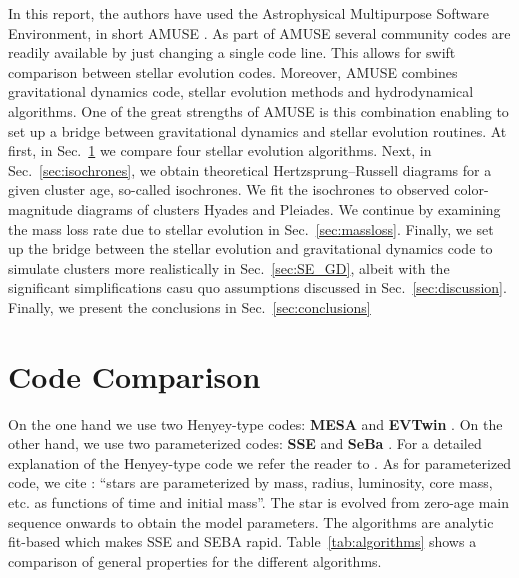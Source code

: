 \documentclass{aa}
\begin{document}
In this report, the authors have used the Astrophysical Multipurpose Software Environment, in short AMUSE \citep{2009NewA...14..369P, 2013CoPhC.183..456P, 2013A&A...557A..84P}. As part of AMUSE several community codes are readily available by just changing a single code line. This allows for swift comparison between stellar evolution codes. Moreover, AMUSE combines gravitational dynamics code, stellar evolution methods and hydrodynamical algorithms. One of the great strengths of AMUSE is this combination enabling to set up a bridge between gravitational dynamics and stellar evolution routines. At first, in Sec.~\ref{sec:algorithms} we compare four stellar evolution algorithms. Next, in Sec.~\ref{sec:isochrones}, we obtain theoretical Hertzsprung–Russell diagrams for a given cluster age, so-called isochrones. We fit the isochrones to observed color-magnitude diagrams of clusters Hyades and Pleiades. We continue by examining the mass loss rate due to stellar evolution in Sec.~\ref{sec:massloss}. Finally, we set up the bridge between the stellar evolution and gravitational dynamics code to simulate clusters more realistically in Sec.~\ref{sec:SE_GD}, albeit with the significant simplifications casu quo assumptions discussed in Sec.~\ref{sec:discussion}. Finally, we present the conclusions in Sec.~\ref{sec:conclusions}

\section{Code Comparison}\label{sec:algorithms}
On the one hand we use two Henyey-type codes: \textbf{MESA} \citep{2011ApJS..192....3P, 2013ApJS..208....4P} and \textbf{EVTwin} \citep{1971MNRAS.151..351E, 1972MNRAS.156..361E, 1973MNRAS.163..279E, 1973A&A....23..325E, 1994MNRAS.270..121H, 1995MNRAS.274..964P, 2001ASPC..229..157E, 2001ApJ...552..664N, 2002ApJ...575..461E, 2007A&A...464L..57S, 2004MNRAS.348..201E, 2008A&A...488.1007G}. On the other hand, we use two parameterized codes:  \textbf{SSE} \citep{2000MNRAS.315..543H} and \textbf{SeBa} \citep{1996A&A...309..179P, 2012A&A...546A..70T}. For a detailed explanation of the Henyey-type code we refer the reader to \cite{1959ApJ...129..628H}. As for parameterized code, we cite \cite{AMUSEdocumentation}: ``stars are parameterized by mass, radius, luminosity, core mass, etc. as functions of time and initial mass''. The star is evolved from zero-age main sequence onwards to obtain the model parameters. The algorithms are analytic fit-based which makes SSE and SEBA rapid. Table~\ref{tab:algorithms} shows a comparison of general properties for the different algorithms.
\end{document}
